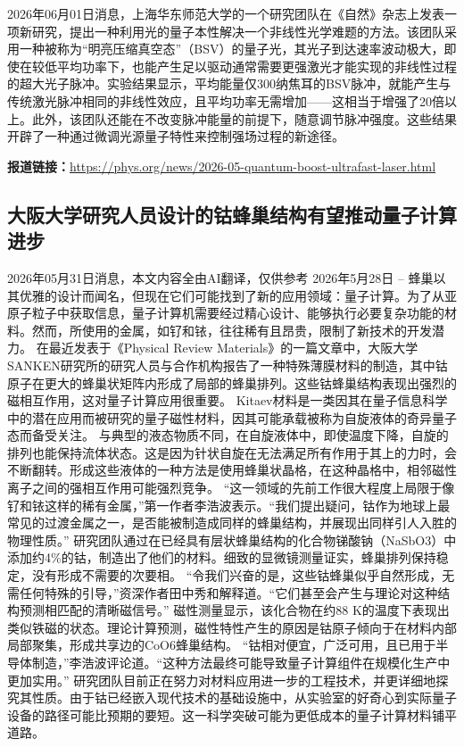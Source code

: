 \documentclass[12pt,a4paper]{ctexart}
\begin{document}
2026年06月01日消息，上海华东师范大学的一个研究团队在《自然》杂志上发表一项新研究，提出一种利用光的量子本性解决一个非线性光学难题的方法。该团队采用一种被称为“明亮压缩真空态”（BSV）的量子光，其光子到达速率波动极大，即使在较低平均功率下，也能产生足以驱动通常需要更强激光才能实现的非线性过程的超大光子脉冲。实验结果显示，平均能量仅300纳焦耳的BSV脉冲，就能产生与传统激光脉冲相同的非线性效应，且平均功率无需增加——这相当于增强了20倍以上。此外，该团队还能在不改变脉冲能量的前提下，随意调节脉冲强度。这些结果开辟了一种通过微调光源量子特性来控制强场过程的新途径。

\noindent\textbf{报道链接：}\url{https://phys.org/news/2026-05-quantum-boost-ultrafast-laser.html}

\subsection{ 大阪大学研究人员设计的钴蜂巢结构有望推动量子计算进步 }

2026年05月31日消息，本文内容全由AI翻译，仅供参考
2026年5月28日 -- 蜂巢以其优雅的设计而闻名，但现在它们可能找到了新的应用领域：量子计算。为了从亚原子粒子中获取信息，量子计算机需要经过精心设计、能够执行必要复杂功能的材料。然而，所使用的金属，如钌和铱，往往稀有且昂贵，限制了新技术的开发潜力。
在最近发表于《Physical Review Materials》的一篇文章中，大阪大学SANKEN研究所的研究人员与合作机构报告了一种特殊薄膜材料的制造，其中钴原子在更大的蜂巢状矩阵内形成了局部的蜂巢排列。这些钴蜂巢结构表现出强烈的磁相互作用，这对量子计算应用很重要。
Kitaev材料是一类因其在量子信息科学中的潜在应用而被研究的量子磁性材料，因其可能承载被称为自旋液体的奇异量子态而备受关注。
与典型的液态物质不同，在自旋液体中，即使温度下降，自旋的排列也能保持流体状态。这是因为针状自旋在无法满足所有作用于其上的力时，会不断翻转。形成这些液体的一种方法是使用蜂巢状晶格，在这种晶格中，相邻磁性离子之间的强相互作用可能强烈竞争。
“这一领域的先前工作很大程度上局限于像钌和铱这样的稀有金属，”第一作者李浩波表示。“我们提出疑问，钴作为地球上最常见的过渡金属之一，是否能被制造成同样的蜂巢结构，并展现出同样引人入胜的物理性质。”
研究团队通过在已经具有层状蜂巢结构的化合物锑酸钠（NaSbO3）中添加约4\%的钴，制造出了他们的材料。细致的显微镜测量证实，蜂巢排列保持稳定，没有形成不需要的次要相。
“令我们兴奋的是，这些钴蜂巢似乎自然形成，无需任何特殊的引导，”资深作者田中秀和解释道。“它们甚至会产生与理论对这种结构预测相匹配的清晰磁信号。”
磁性测量显示，该化合物在约88 K的温度下表现出类似铁磁的状态。理论计算预测，磁性特性产生的原因是钴原子倾向于在材料内部局部聚集，形成共享边的CoO6蜂巢结构。
“钴相对便宜，广泛可用，且已用于半导体制造，”李浩波评论道。“这种方法最终可能导致量子计算组件在规模化生产中更加实用。”
研究团队目前正在努力对材料应用进一步的工程技术，并更详细地探究其性质。由于钴已经嵌入现代技术的基础设施中，从实验室的好奇心到实际量子设备的路径可能比预期的要短。这一科学突破可能为更低成本的量子计算材料铺平道路。
\end{document}
